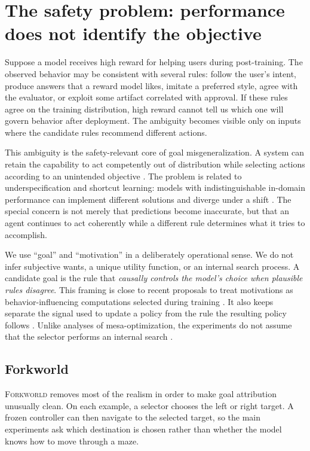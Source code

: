 \documentclass[11pt,a4paper]{article}
\newcommand{\Forkworld}{\textsc{Forkworld}}
\begin{document}
\section*{The safety problem: performance does not identify the objective}

Suppose a model receives high reward for helping users during post-training. The observed behavior may be consistent with several rules: follow the user's intent, produce answers that a reward model likes, imitate a preferred style, agree with the evaluator, or exploit some artifact correlated with approval. If these rules agree on the training distribution, high reward cannot tell us which one will govern behavior after deployment. The ambiguity becomes visible only on inputs where the candidate rules recommend different actions.

This ambiguity is the safety-relevant core of goal misgeneralization. A system can retain the capability to act competently out of distribution while selecting actions according to an unintended objective \citep{langosco2022goal,shah2022goal}. The problem is related to underspecification and shortcut learning: models with indistinguishable in-domain performance can implement different solutions and diverge under a shift \citep{damour2022underspecification,geirhos2020shortcut}. The special concern is not merely that predictions become inaccurate, but that an agent continues to act coherently while a different rule determines what it tries to accomplish.

We use ``goal'' and ``motivation'' in a deliberately operational sense. We do not infer subjective wants, a unique utility function, or an internal search process. A candidate goal is the rule that \emph{causally controls the model's choice when plausible rules disagree}. This framing is close to recent proposals to treat motivations as behavior-influencing computations selected during training \citep{mallen2025behavioral,africa2026intentions}. It also keeps separate the signal used to update a policy from the rule the resulting policy follows \citep{turner2022reward}. Unlike analyses of mesa-optimization, the experiments do not assume that the selector performs an internal search \citep{hubinger2019risks}.

\subsection*{Forkworld}

\Forkworld{} removes most of the realism in order to make goal attribution unusually clean. On each example, a selector chooses the left or right target. A frozen controller can then navigate to the selected target, so the main experiments ask which destination is chosen rather than whether the model knows how to move through a maze.
\end{document}
